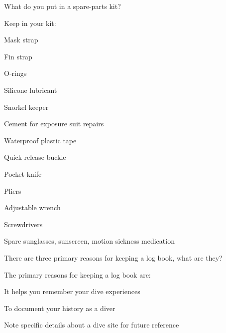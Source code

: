 	\begin{qanda}
		\begin{question}
What do you put in a spare-parts kit?
		\end{question}

		\begin{answer}
Keep in your kit:
			\begin{nospacenumberedlist}
				\item Mask strap
				\item Fin strap
				\item O-rings
				\item Silicone lubricant
				\item Snorkel keeper
				\item Cement for exposure suit repairs
				\item Waterproof plastic tape
				\item Quick-release buckle
				\item Pocket knife
				\item Pliers
				\item Adjustable wrench
				\item Screwdrivers
				\item Spare sunglasses, sunscreen, motion sickness medication
			\end{nospacenumberedlist}
		\end{answer}
	\end{qanda}

	\begin{qanda}
		\begin{question}
There are three primary reasons for keeping a log book, what are they?
		\end{question}

		\begin{answer}
The primary reasons for keeping a log book are:
			\begin{nospacenumberedlist}
				\item It helps you remember your dive experiences
				\item To document your history as a diver
				\item Note specific details about a dive site for future reference
			\end{nospacenumberedlist}
		\end{answer}
	\end{qanda}

